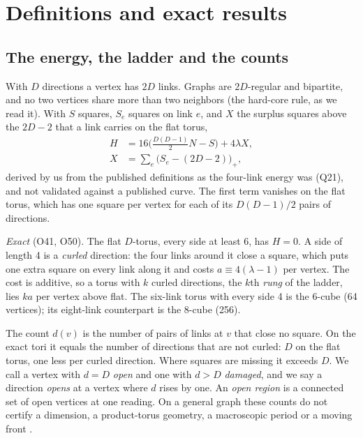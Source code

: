 \documentclass[aps,pre,10pt,twocolumn,superscriptaddress,nofootinbib]{revtex4-2}
\begin{document}
\section{Definitions and exact results}
\label{sec:exact}

\subsection{The energy, the ladder and the counts}

With $D$ directions a vertex has $2D$ links. Graphs are $2D$-regular and bipartite, and no two vertices share more
than two neighbors (the hard-core rule, as we read it). With $S$ squares, $S_e$ squares on link $e$, and $X$ the surplus
squares above the $2D - 2$ that a link carries on the flat torus,
\begin{equation}
\begin{aligned}
  H &= 16\Big(\tfrac{D(D-1)}{2} N - S\Big) + 4\lambda X ,\\
  X &= \textstyle\sum_e \big(S_e - (2D - 2)\big)_+ ,
\end{aligned}
\end{equation}
derived by us from the published definitions as the four-link energy was (Q21), and not validated against a
published curve. The first term vanishes on the flat torus, which has one square per vertex for each of its
$D(D-1)/2$ pairs of directions.

\emph{Exact} (O41, O50). The flat $D$-torus, every side at least 6, has $H = 0$. A side of length 4 is a
\emph{curled} direction: the four links around it close a square, which puts one extra square on every link along
it and costs $a \equiv 4(\lambda - 1)$ per
vertex. The cost is additive, so a torus with $k$ curled directions, the $k$th \emph{rung} of the ladder, lies $ka$
per vertex above flat. The six-link torus with every side 4 is the 6-cube (64 vertices); its eight-link
counterpart is the 8-cube (256).

The count $d(v)$ is the number of pairs of links at $v$ that close no square. On the exact tori it equals the number
of directions that are not curled: $D$ on the flat torus, one less per curled direction. Where squares are missing it
exceeds $D$. We call a vertex with $d = D$ \emph{open} and one with $d > D$ \emph{damaged}, and we say a direction
\emph{opens} at a vertex where $d$ rises by one. An \emph{open region} is a connected set of open vertices at one
reading. On a general graph these counts do not certify a dimension, a
product-torus geometry, a macroscopic period or a moving front \cite{repo}.
\end{document}

